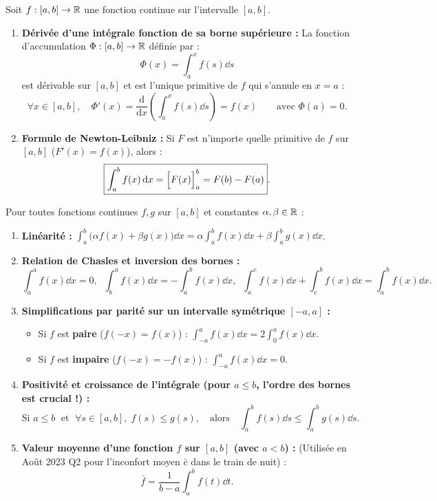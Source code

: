 \begin{theoreme}
Soit $f : [a, b] \to \mathbb{R}$ une fonction continue sur l'intervalle $[a, b]$.
\begin{enumerate}
    \item \textbf{Dérivée d'une intégrale fonction de sa borne supérieure :} La fonction d'accumulation $\Phi : [a, b] \to \mathbb{R}$ définie par :
    \[
        \Phi(x) = \int_a^x f(s)\dd s
    \]
    est dérivable sur $[a, b]$ et est l'unique primitive de $f$ qui s'annule en $x = a$ :
    \[
        \boxed{\forall x \in [a, b], \quad \Phi'(x) = \frac{\mathrm{d}}{\mathrm{d}x}\left(\int_a^x f(s)\dd s\right) = f(x) \qquad \text{avec } \Phi(a) = 0}.
    \]
    \item \textbf{Formule de Newton-Leibniz :} Si $F$ est n'importe quelle primitive de $f$ sur $[a, b]$ ($F'(x) = f(x)$), alors :
    \[
        \boxed{\int_a^b f(x)\,\mathrm{d} x = \Bigl[F(x)\Bigr]_a^b = F(b) - F(a)}.
    \]
\end{enumerate}
\end{theoreme}

\begin{theoreme}
Pour toutes fonctions continues $f, g$ sur $[a, b]$ et constantes $\alpha, \beta \in \mathbb{R}$ :
\begin{enumerate}
    \item \textbf{Linéarité :} $\displaystyle\int_a^b \bigl(\alpha f(x) + \beta g(x)\bigr)\dd x = \alpha\int_a^b f(x)\dd x + \beta\int_a^b g(x)\dd x$.
    \item \textbf{Relation de Chasles et inversion des bornes :}
    \[
        \int_a^a f(x)\dd x = 0, \;\; \int_b^a f(x)\dd x = -\int_a^b f(x)\dd x, \;\; \int_a^c f(x)\dd x + \int_c^b f(x)\dd x = \int_a^b f(x)\dd x.
    \]
    \item \textbf{Simplifications par parité sur un intervalle symétrique $[-a, a]$ :}
    \begin{itemize}
        \item Si $f$ est \textbf{paire} ($f(-x) = f(x)$) : $\boxed{\displaystyle\int_{-a}^a f(x)\dd x = 2\int_0^a f(x)\dd x}$.
        \item Si $f$ est \textbf{impaire} ($f(-x) = -f(x)$) : $\boxed{\displaystyle\int_{-a}^a f(x)\dd x = 0}$.
    \end{itemize}
    \item \textbf{Positivité et croissance de l'intégrale (pour $a \le b$, l'ordre des bornes est crucial !) :}
    \[
        \boxed{\text{Si } a \le b \;\text{ et }\; \forall s \in [a, b], \; f(s) \le g(s), \quad \text{alors} \quad \int_a^b f(s)\dd s \le \int_a^b g(s)\dd s}.
    \]
    \item \textbf{Valeur moyenne d'une fonction $f$ sur $[a, b]$ (avec $a < b$) :} (Utilisée en Août 2023 Q2 pour l'inconfort moyen $\bar{c}$ dans le train de nuit) :
    \[
        \boxed{\bar{f} = \frac{1}{b - a}\int_a^b f(t)\dd t}.
    \]
\end{enumerate}
\end{theoreme}


